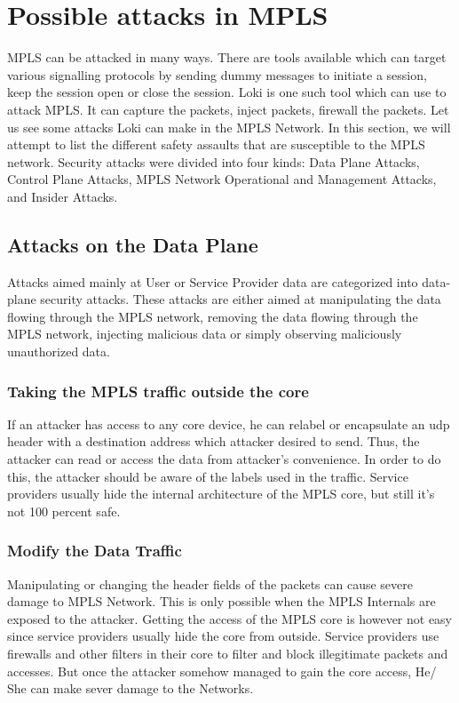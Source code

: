 \section{Possible attacks in MPLS}


MPLS can be attacked in many ways\cite{grayson_guernsey_butts_spainhower_shenoi_2009}. There are tools available which can target various signalling protocols by sending dummy messages to initiate a session, keep the session open or close the session. Loki is one such tool which can use to attack MPLS. It can capture the packets, inject packets, firewall the packets. Let us see some attacks Loki can make in the MPLS Network. In this section, we will attempt to list the different safety assaults that are susceptible to the MPLS network. Security attacks were divided into four kinds: Data Plane Attacks, Control Plane Attacks, MPLS Network Operational and Management Attacks, and Insider Attacks.

\subsection{Attacks on the Data Plane}

Attacks aimed mainly at User or Service Provider data are categorized into data-plane security attacks. These attacks are either aimed at manipulating the data flowing through the MPLS network, removing the data flowing through the MPLS network, injecting malicious data or simply observing maliciously unauthorized data. 

\subsubsection{Taking the MPLS traffic outside the core} 

If an attacker has access to any core device, he can relabel or encapsulate an udp header with a destination address which attacker desired to send. Thus, the attacker can read or access the data from attacker's convenience. In order to do this, the attacker should be aware of the labels used in the traffic. Service providers usually hide the internal architecture of the MPLS core, but still it's not 100 percent safe. 

 
\subsubsection{Modify the Data Traffic}

Manipulating or changing the header fields of the packets can cause severe damage to MPLS Network. This is only possible when the MPLS Internals are exposed to the attacker. Getting the access of the MPLS core is however not easy since service providers usually hide the core from outside. Service providers use firewalls and other filters in their core to filter and block illegitimate packets and accesses. But once the attacker somehow managed to gain the core access, He/ She can make sever damage to the Networks. 

